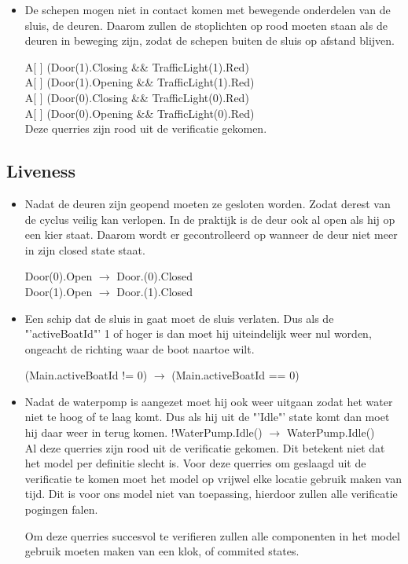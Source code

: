 \documentclass{article}
\begin{document}
\begin{itemize}
\item De schepen mogen niet in contact komen met bewegende onderdelen van de sluis, de deuren. Daarom zullen de stoplichten op rood moeten staan als de deuren in beweging zijn, zodat de schepen buiten de sluis op afstand blijven.

{\center
A[ ] (Door(1).Closing \&\& TrafficLight(1).Red)\\
A[ ] (Door(1).Opening \&\& TrafficLight(1).Red)\\
A[ ] (Door(0).Closing \&\& TrafficLight(0).Red)\\
A[ ] (Door(0).Opening \&\& TrafficLight(0).Red)\\
}
Deze querries zijn {\color{red}rood} uit de verificatie gekomen. 
\end{itemize}





\clearpage %
\subsection{Liveness}
\begin{itemize}

\item Nadat de deuren zijn geopend moeten ze gesloten worden. Zodat derest van
de cyclus veilig kan verlopen. In de praktijk is de deur ook al open als hij op
een kier staat. Daarom wordt er gecontrolleerd op wanneer de deur niet meer
in zijn closed state staat.

{\center
Door(0).Open $\rightarrow$ Door.(0).Closed\\
Door(1).Open $\rightarrow$ Door.(1).Closed\\
}
\item Een schip dat de sluis in gaat moet de sluis verlaten. Dus als de "'activeBoatId"' 1 of hoger is dan moet hij uiteindelijk weer nul worden, ongeacht de richting waar de boot naartoe wilt.

{\center
(Main.activeBoatId != 0) $\rightarrow$ (Main.activeBoatId == 0)\\
}

\item Nadat de waterpomp is aangezet moet hij ook weer uitgaan zodat het water niet te hoog of te laag komt. Dus als hij uit de "'Idle"' state komt dan moet hij daar weer in terug komen.
{\center
!WaterPump.Idle() $\rightarrow$ WaterPump.Idle()\\
}
\vskip0.5cm
Al deze querries zijn {\color{red}rood} uit de verificatie gekomen. Dit betekent niet dat het model per definitie slecht is. Voor deze querries om geslaagd uit de verificatie te komen moet het model op vrijwel elke locatie gebruik maken van tijd. Dit is voor ons model niet van toepassing, hierdoor zullen alle verificatie pogingen falen.

Om deze querries succesvol te verifieren zullen alle componenten in het model gebruik moeten maken van een klok, of commited states.

\end{itemize}
\end{document}
